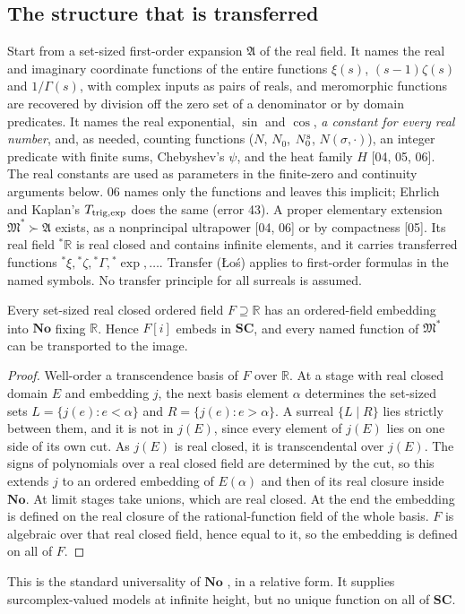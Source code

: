 \documentclass[11pt,a4paper]{article}
\numberwithin{equation}{section}
\theoremstyle{definition}
\theoremstyle{remark}
\newcommand{\No}{\mathbf{No}}
\newcommand{\SC}{\mathbf{SC}}
\newcommand{\R}{\mathbb R}
\newcommand{\src}[1]{\textup{[#1]}}
\begin{document}
\subsection{The structure that is transferred}\label{gz:sec:structure}
Start from a set-sized first-order expansion $\mathfrak A$ of the real field.
It names the real and imaginary coordinate functions of the entire functions
$\xi(s)$, $(s-1)\zeta(s)$ and $1/\Gamma(s)$, with complex inputs as pairs of
reals, and meromorphic functions are recovered by division off the zero set
of a denominator or by domain predicates. It names the real exponential,
$\sin$ and $\cos$, \emph{a constant for every real number}, and, as needed,
counting functions ($N$, $N_0$, $N_0^{\rm s}$, $N(\sigma,\cdot)$), an integer
predicate with finite sums, Chebyshev's $\psi$, and the heat family $H$
\src{04, 05, 06}. The real constants are used as parameters in the
finite-zero and continuity arguments below. 06 names only the functions and
leaves this implicit; Ehrlich and Kaplan's $T_{\rm trig,exp}$ does the same
(error 43). A proper elementary extension $\mathfrak M^*\succ\mathfrak A$ exists,
as a nonprincipal ultrapower \src{04, 06} or by compactness \src{05}. Its
real field ${}^*\R$ is real closed and contains infinite elements, and it
carries transferred functions ${}^*\xi,{}^*\zeta,{}^*\Gamma,{}^*\exp,\dots$.
Transfer (Łoś) applies to first-order formulas in the named symbols. No
transfer principle for all surreals is assumed.

\begin{proposition}[Realization inside the surreals \src{04, 05, 06}]\label{gz:prop:embedding}
Every set-sized real closed ordered field $F\supseteq\R$ has an ordered-field
embedding into $\No$ fixing $\R$. Hence $F[i]$ embeds in $\SC$, and every
named function of $\mathfrak M^*$ can be transported to the image.
\end{proposition}
\begin{proof}
Well-order a transcendence basis of $F$ over $\R$. At a stage with real
closed domain $E$ and embedding $j$, the next basis element $\alpha$
determines the set-sized sets $L=\{j(e):e<\alpha\}$ and $R=\{j(e):e>\alpha\}$.
A surreal $\{L\mid R\}$ lies strictly between them, and it is not in $j(E)$,
since every element of $j(E)$ lies on one side of its own cut. As $j(E)$ is
real closed, it is transcendental over $j(E)$. The signs of polynomials over
a real closed field are determined by the cut, so this extends $j$ to an
ordered embedding of $E(\alpha)$ and then of its real closure inside $\No$.
At limit stages take unions, which are real closed. At the end the
embedding is defined on the real closure of the rational-function field of
the whole basis. $F$ is algebraic over that real closed field, hence equal
to it, so the embedding is defined on all of $F$.
\end{proof}
This is the standard universality of $\No$ \cite{Gonshor,vdDE}, in a relative
form. It supplies surcomplex-valued models at infinite height, but no unique
function on all of $\SC$.
\end{document}
